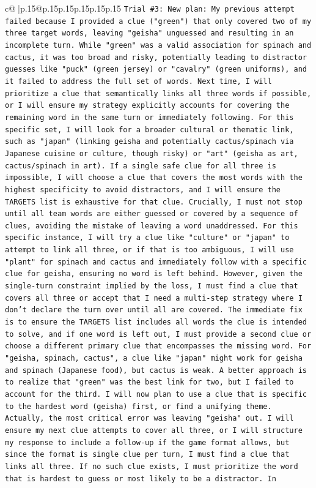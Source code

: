 \documentclass{article}
\begin{document}
{\begin{supertabular}{c@{$\;$}|p{.15\linewidth}@{}p{.15\linewidth}p{.15\linewidth}p{.15\linewidth}p{.15\linewidth}p{.15\linewidth}}
{{{\texttt{Trial \#3: New plan: My previous attempt failed because I provided a clue ("green") that only covered two of my three target words, leaving "geisha" unguessed and resulting in an incomplete turn. While "green" was a valid association for spinach and cactus, it was too broad and risky, potentially leading to distractor guesses like "puck" (green jersey) or "cavalry" (green uniforms), and it failed to address the full set of words. Next time, I will prioritize a clue that semantically links all three words if possible, or I will ensure my strategy explicitly accounts for covering the remaining word in the same turn or immediately following. For this specific set, I will look for a broader cultural or thematic link, such as "japan" (linking geisha and potentially cactus/spinach via Japanese cuisine or culture, though risky) or "art" (geisha as art, cactus/spinach in art). If a single safe clue for all three is impossible, I will choose a clue that covers the most words with the highest specificity to avoid distractors, and I will ensure the TARGETS list is exhaustive for that clue. Crucially, I must not stop until all team words are either guessed or covered by a sequence of clues, avoiding the mistake of leaving a word unaddressed. For this specific instance, I will try a clue like "culture" or "japan" to attempt to link all three, or if that is too ambiguous, I will use "plant" for spinach and cactus and immediately follow with a specific clue for geisha, ensuring no word is left behind. However, given the single{-}turn constraint implied by the loss, I must find a clue that covers all three or accept that I need a multi{-}step strategy where I don't declare the turn over until all are covered. The immediate fix is to ensure the TARGETS list includes all words the clue is intended to solve, and if one word is left out, I must provide a second clue or choose a different primary clue that encompasses the missing word. For "geisha, spinach, cactus", a clue like "japan" might work for geisha and spinach (Japanese food), but cactus is weak. A better approach is to realize that "green" was the best link for two, but I failed to account for the third. I will now plan to use a clue that is specific to the hardest word (geisha) first, or find a unifying theme. Actually, the most critical error was leaving "geisha" out. I will ensure my next clue attempts to cover all three, or I will structure my response to include a follow{-}up if the game format allows, but since the format is single clue per turn, I must find a clue that links all three. If no such clue exists, I must prioritize the word that is hardest to guess or most likely to be a distractor. In} \\
}}}
\end{supertabular}}
\end{document}
